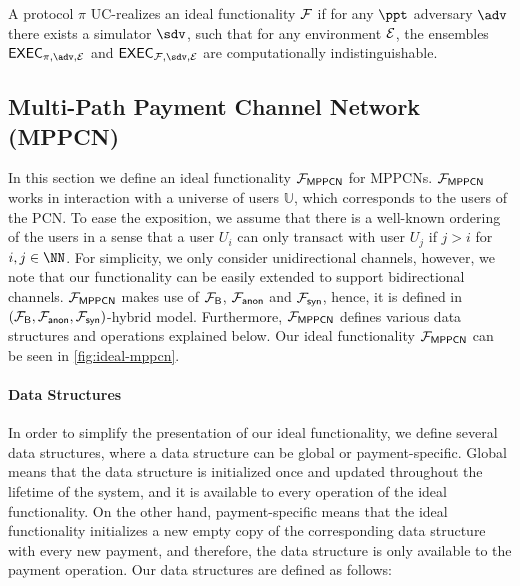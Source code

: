 \begin{definition}
A protocol $\pi$ UC-realizes an ideal functionality $\mathcal{F}$ if for any $\ppt$ adversary 
$\adv$ there exists a simulator $\sdv$, such that for any environment $\mathcal{E}$, the 
ensembles $\exec_{\pi, \adv, \dist}$ and $\exec_{\FF, \sdv, \dist}$ are computationally 
indistinguishable.
\end{definition}

\subsection{Multi-Path Payment Channel Network (MPPCN)}
\label{sec:mppcn}

In this section we define an ideal functionality $\mathcal{F}_{\mathsf{MPPCN}}$ for MPPCNs. 
$\mathcal{F}_{\mathsf{MPPCN}}$ works in interaction with a universe of users $\mathbb{U}$, which 
corresponds to the users of the PCN. To ease the exposition, we assume that there is a 
well-known ordering of the users in a sense that a user $U_i$ can only transact with user $U_j$ 
if $j > i$ for $i,j \in \NN$. For simplicity, we only consider unidirectional channels, 
however, we note that our functionality can be easily extended to support bidirectional 
channels.  $\mathcal{F}_{\mathsf{MPPCN}}$ makes use of $\mathcal{F}_{\mathsf{B}}$, $\mathcal{F}_{\mathsf{anon}}$ and $\mathcal{F}_{\mathsf{syn}}$, 
hence, it is defined in $(\mathcal{F}_{\mathsf{B}}, \mathcal{F}_{\mathsf{anon}}, \mathcal{F}_{\mathsf{syn}})$-hybrid model. Furthermore, 
$\mathcal{F}_{\mathsf{MPPCN}}$ defines various data structures and operations explained below. 
Our ideal functionality $\mathcal{F}_{\mathsf{MPPCN}}$ can be seen in \cref{fig:ideal-mppcn}.

\paragraph{Data Structures} 
In order to simplify the presentation of our ideal functionality, we define several data 
structures, where a data structure can be global or payment-specific. Global means that the 
data structure is initialized once and updated throughout the lifetime of the system, and it 
is available to every operation of the ideal functionality. On the other hand, payment-specific 
means that the ideal functionality initializes a new empty copy of the corresponding data 
structure with every new payment, and therefore, the data structure is only available to 
the payment operation. Our data structures are defined as follows:

